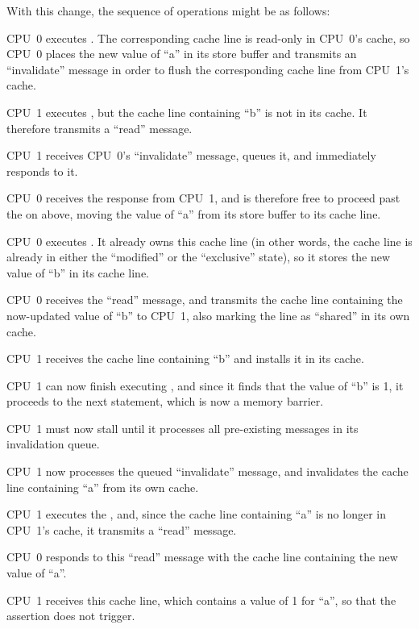 \begin{fcvref}
With this change, the sequence of operations might be as follows:
\begin{sequence}
\item	CPU~0 executes .
	The corresponding cache line is read-only in CPU~0's cache,
	so CPU~0 places the new value of ``a'' in its store buffer and
	transmits an ``invalidate'' message in order to flush the
	corresponding cache line from CPU~1's cache.
\item	CPU~1 executes , but the cache line
	containing ``b'' is not in its cache.
	It therefore transmits a ``read'' message.
\item	CPU~1 receives CPU~0's ``invalidate'' message, queues it, and
	immediately responds to it.
\item	CPU~0 receives the response from CPU~1, and is therefore free
	to proceed past the  on  above, moving
	the value of ``a'' from its store buffer to its cache line.
\item	CPU~0 executes .
	It already owns this cache line (in other words, the cache line
	is already in either the ``modified'' or the ``exclusive'' state),
	so it stores the new value of ``b'' in its cache line.
\item	CPU~0 receives the ``read'' message, and transmits the
	cache line containing the now-updated value of ``b''
	to CPU~1, also marking the line as ``shared'' in its own cache.
\item	CPU~1 receives the cache line containing ``b'' and installs
	it in its cache.
\item	CPU~1 can now finish executing ,
	and since it finds that the value of ``b'' is 1, it proceeds
	to the next statement, which is now a memory barrier.
\item	CPU~1 must now stall until it processes all pre-existing
	messages in its invalidation queue.
\item	CPU~1 now processes the queued
	``invalidate'' message, and
	invalidates the cache line containing ``a'' from its own cache.
\item	CPU~1 executes the , and, since the
	cache line containing ``a'' is no longer in CPU~1's cache,
	it transmits a ``read'' message.
\item	CPU~0 responds to this ``read'' message with the cache line
	containing the new value of ``a''.
\item	CPU~1 receives this cache line, which contains a value of 1 for
	``a'', so that the assertion does not trigger.
\end{sequence}
\end{fcvref}

